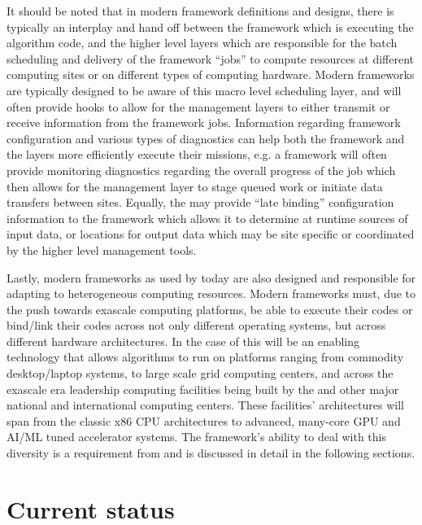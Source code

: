 \documentclass[../main-v1.tex]{subfiles}
\begin{document}
It should be noted that in modern framework definitions and designs, there is typically an interplay and hand off between the framework which is executing the algorithm code, and the higher level  layers which are responsible for the batch scheduling and delivery of the framework ``jobs'' to compute resources at different computing sites or on different types of computing hardware.  Modern frameworks are typically designed to be aware of this macro level scheduling layer, and will often provide hooks to allow for the management layers to either transmit or receive information from the framework jobs. Information regarding framework configuration and various types of diagnostics can help both the framework and the  layers more efficiently execute their missions, e.g. a framework will often provide monitoring diagnostics regarding the overall progress of the job which then allows for the management layer to stage queued work or initiate data transfers between sites.  Equally, the  may provide ``late binding'' configuration information to the framework which allows it to determine at runtime sources of input data, or locations for output data which may be site specific or coordinated by the higher level management tools.

Lastly, modern frameworks as used by  today are also designed and responsible for adapting to  heterogeneous computing resources.  Modern frameworks must, due to the push towards exascale computing platforms, be able to execute their codes or bind/link their codes across not only different operating systems, but across different hardware architectures.   In the case of  this will be an enabling technology that allows  algorithms to run on platforms ranging from commodity desktop/laptop systems, to large scale grid computing centers, and across the exascale era leadership computing facilities being built by the  and other major national and international computing centers. These facilities' architectures will span from the classic x86 CPU architectures to advanced, many-core GPU and AI/ML tuned accelerator systems.  The framework's ability to deal with this diversity is a requirement from  and is discussed in detail in the following sections.

\section{Current status}\label{sec:framework:status}
\end{document}

